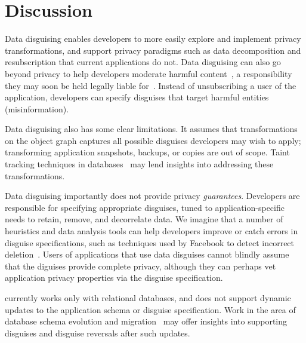 \section{Discussion}
Data disguising enables developers to more easily explore and implement privacy transformations, and
support privacy paradigms such as data decomposition and resubscription that current applications do
not.  Data disguising can also go beyond privacy to help developers moderate harmful
content~\cite{contentmod, sasb}, a responsibility they may soon be held legally liable
for~\cite{nytimes:230}. Instead of unsubscribing a user of the application, developers can specify
disguises that target harmful entities (\eg misinformation).

Data disguising also has some clear limitations. It assumes that transformations on the object graph
captures all possible disguises developers may wish to apply; transforming application
snapshots, backups, or copies are out of scope. Taint tracking techniques in
databases~\cite{schengendb} may lend insights into addressing these transformations.

Data disguising importantly does not provide privacy \emph{guarantees}. Developers are responsible for
specifying appropriate disguises, tuned to application-specific needs to retain, remove, and decorrelate
data. 
We imagine that a number of heuristics and data analysis tools can help developers improve or catch
errors in disguise specifications, such as techniques used by Facebook to detect incorrect
deletion~\cite{delf}.  Users of applications that use data disguises cannot blindly assume that the
diguises provide complete privacy, although they can perhaps vet application privacy properties via the
disguise specification.

\sys currently works only with relational databases, and does not support dynamic
updates to the application schema or disguise specification.
Work in the area of database schema evolution and migration~\cite{schema:evo} may offer insights
into supporting disguises and disguise reversals after such updates.



